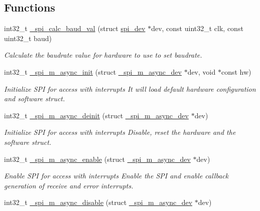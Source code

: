 \subsection*{Functions}
\begin{DoxyCompactItemize}
\item 
int32\+\_\+t \hyperlink{group__hpl__spi_gaf83a57ec4a0328b8d58c9aa847867445}{\+\_\+spi\+\_\+calc\+\_\+baud\+\_\+val} (struct \hyperlink{structspi__dev}{spi\+\_\+dev} $\ast$dev, const uint32\+\_\+t clk, const uint32\+\_\+t baud)
\begin{DoxyCompactList}\small\item\em Calculate the baudrate value for hardware to use to set baudrate. \end{DoxyCompactList}\item 
int32\+\_\+t \hyperlink{group__hpl__spi_gab967bf854bc706f4bd6ba5a327dc32b1}{\+\_\+spi\+\_\+m\+\_\+async\+\_\+init} (struct \hyperlink{group__hpl__spi_gaab37ebaab3686617eb20d5d175e82e6a}{\+\_\+spi\+\_\+m\+\_\+async\+\_\+dev} $\ast$dev, void $\ast$const hw)
\begin{DoxyCompactList}\small\item\em Initialize S\+PI for access with interrupts It will load default hardware configuration and software struct. \end{DoxyCompactList}\item 
int32\+\_\+t \hyperlink{group__hpl__spi_gae4360b2d04093ceebe9c544c1d38703c}{\+\_\+spi\+\_\+m\+\_\+async\+\_\+deinit} (struct \hyperlink{group__hpl__spi_gaab37ebaab3686617eb20d5d175e82e6a}{\+\_\+spi\+\_\+m\+\_\+async\+\_\+dev} $\ast$dev)
\begin{DoxyCompactList}\small\item\em Initialize S\+PI for access with interrupts Disable, reset the hardware and the software struct. \end{DoxyCompactList}\item 
int32\+\_\+t \hyperlink{group__hpl__spi_gadae03c08b6d35ed7ab360e5a3186819c}{\+\_\+spi\+\_\+m\+\_\+async\+\_\+enable} (struct \hyperlink{group__hpl__spi_gaab37ebaab3686617eb20d5d175e82e6a}{\+\_\+spi\+\_\+m\+\_\+async\+\_\+dev} $\ast$dev)
\begin{DoxyCompactList}\small\item\em Enable S\+PI for access with interrupts Enable the S\+PI and enable callback generation of receive and error interrupts. \end{DoxyCompactList}\item 
int32\+\_\+t \hyperlink{group__hpl__spi_gaaeefe807432ef5d2416ba1659b9f807f}{\+\_\+spi\+\_\+m\+\_\+async\+\_\+disable} (struct \hyperlink{group__hpl__spi_gaab37ebaab3686617eb20d5d175e82e6a}{\+\_\+spi\+\_\+m\+\_\+async\+\_\+dev} $\ast$dev)

\end{DoxyCompactItemize}
